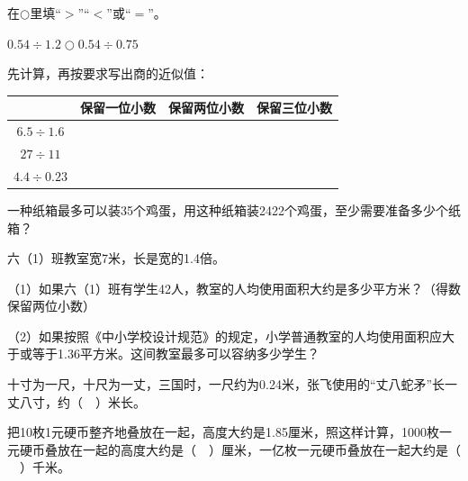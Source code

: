 \vspace{5cm}
\begin{mistake}
在$\bigcirc$里填“$>$”“$<$”或“$=$”。

$0.54\div1.2\bigcirc0.54\div0.75$
\end{mistake}

\vspace{5cm}
\begin{mistake}
先计算，再按要求写出商的近似值：

\begin{center}
\begin{tabular}{|c|c|c|c|}
\hline
 & 保留一位小数 & 保留两位小数 & 保留三位小数\\
\hline
$6.5\div1.6$ & & & \\
\hline
$27\div11$ & & & \\
\hline
$4.4\div0.23$ & & & \\
\hline
\end{tabular}
\end{center}
\end{mistake}

\vspace{5cm}
\begin{mistake}
一种纸箱最多可以装35个鸡蛋，用这种纸箱装2422个鸡蛋，至少需要准备多少个纸箱？
\end{mistake}

\vspace{5cm}
\begin{mistake}
六（1）班教室宽7米，长是宽的1.4倍。

（1）如果六（1）班有学生42人，教室的人均使用面积大约是多少平方米？（得数保留两位小数）

（2）如果按照《中小学校设计规范》的规定，小学普通教室的人均使用面积应大于或等于1.36平方米。这间教室最多可以容纳多少学生？
\end{mistake}

\vspace{5cm}
\begin{mistake}
十寸为一尺，十尺为一丈，三国时，一尺约为0.24米，张飞使用的“丈八蛇矛”长一丈八寸，约（$\quad$）米长。
\end{mistake}

\vspace{5cm}
\begin{mistake}
把10枚1元硬币整齐地叠放在一起，高度大约是1.85厘米，照这样计算，1000枚一元硬币叠放在一起的高度大约是（$\quad$）厘米，一亿枚一元硬币叠放在一起大约是（$\quad$）千米。
\end{mistake}

